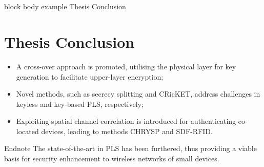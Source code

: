 \section*{}
\begin{frame}{}
\begin{beamercolorbox}[colsep=1.5pt,rounded=true,shadow=true]{block body example}
    \huge{Thesis Conclusion}
\end{beamercolorbox}
\end{frame}


\section{Thesis Conclusion}
\begin{frame}{}
\begin{itemize}

\item A cross-over approach is promoted, utilising the physical layer for key generation to facilitate upper-layer encryption;
\item Novel methods, such as secrecy splitting and CRicKET, address challenges in keyless and key-based PLS, respectively;
\item Exploiting spatial channel correlation is introduced for authenticating co-located devices, leading to methods CHRYSP and SDF-RFID.    
\end{itemize}
\end{frame}

\begin{frame}{Endnote}
  The state-of-the-art in PLS has been furthered, thus providing a viable basis for security enhancement to wireless networks of small devices.  
\end{frame}
